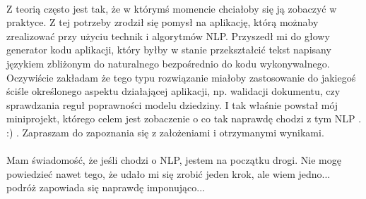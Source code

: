 \paragraph{}
Z teorią często jest tak, że w którymś momencie chciałoby się ją zobaczyć w praktyce. Z tej potrzeby zrodził się pomysł na aplikację, którą możnaby
zrealizować przy użyciu technik i algorytmów NLP.
\newline
Przyszedł mi do głowy generator kodu aplikacji, który byłby w stanie przekształcić tekst napisany językiem zbliżonym do naturalnego bezpośrednio do kodu wykonywalnego.  Oczywiście zakładam że tego typu rozwiązanie miałoby zastosowanie do jakiegoś ściśle określonego aspektu działającej aplikacji, np. walidacji dokumentu, czy sprawdzania reguł poprawności modelu dziedziny.  
\newline
I tak właśnie powstał mój miniprojekt, którego celem jest zobaczenie o co tak naprawdę chodzi z tym NLP . :) . Zapraszam do zapoznania się z założeniami i otrzymanymi wynikami.
\paragraph{}
Mam świadomość, że jeśli chodzi o NLP, jestem na początku drogi. Nie mogę powiedzieć nawet tego, że udało mi się zrobić jeden krok, ale wiem jedno...
podróż zapowiada się naprawdę imponująco...